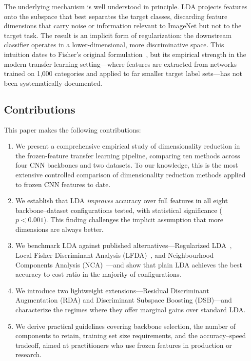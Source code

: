 The underlying mechanism is well understood in principle. LDA projects features onto the subspace that best separates the target classes, discarding feature dimensions that carry noise or information relevant to ImageNet but not to the target task. The result is an implicit form of regularization: the downstream classifier operates in a lower-dimensional, more discriminative space. This intuition dates to Fisher's original formulation~\cite{fisher1936lda}, but its empirical strength in the modern transfer learning setting---where features are extracted from networks trained on 1,000 categories and applied to far smaller target label sets---has not been systematically documented.

\subsection{Contributions}

This paper makes the following contributions:

\begin{enumerate}[leftmargin=*]
    \item We present a comprehensive empirical study of dimensionality reduction in the frozen-feature transfer learning pipeline, comparing ten methods across four CNN backbones and two datasets. To our knowledge, this is the most extensive controlled comparison of dimensionality reduction methods applied to frozen CNN features to date.

    \item We establish that LDA \emph{improves} accuracy over full features in all eight backbone--dataset configurations tested, with statistical significance ($p < 0.001$). This finding challenges the implicit assumption that more dimensions are always better.

    \item We benchmark LDA against published alternatives---Regularized LDA~\cite{friedman1989regularized}, Local Fisher Discriminant Analysis (LFDA)~\cite{sugiyama2007lfda}, and Neighbourhood Components Analysis (NCA)~\cite{goldberger2004nca}---and show that plain LDA achieves the best accuracy-to-cost ratio in the majority of configurations.

    \item We introduce two lightweight extensions---Residual Discriminant Augmentation (RDA) and Discriminant Subspace Boosting (DSB)---and characterize the regimes where they offer marginal gains over standard LDA.

    \item We derive practical guidelines covering backbone selection, the number of components to retain, training set size requirements, and the accuracy--speed tradeoff, aimed at practitioners who use frozen features in production or research.
\end{enumerate}

